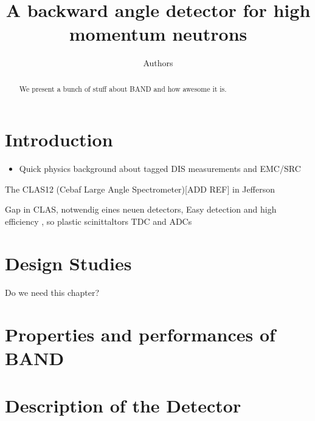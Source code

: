 \documentclass[review]{elsarticle}
\begin{document}
\begin{frontmatter}

\title{A backward angle detector for high momentum neutrons}

\author{Authors}
\address{Addresses}

\author[]{}
\ead[]{}

\begin{abstract}
We present a bunch of stuff about BAND and how awesome it is.
\end{abstract}

\begin{keyword}
\end{keyword}
\end{frontmatter}

\linenumbers

\section{Introduction}
\begin{itemize}
\item Quick physics background about tagged DIS measurements and EMC/SRC
\end{itemize}

The CLAS12 (Cebaf Large Angle Spectrometer)[ADD REF] in Jefferson

Gap in CLAS, notwendig eines neuen detectors, Easy detection and high efficiency , so plastic scinittaltors
TDC and ADCs


\section{Design Studies}
Do we need this chapter?

\section{Properties and performances of BAND}
\section{Description of the Detector}
\end{document}
